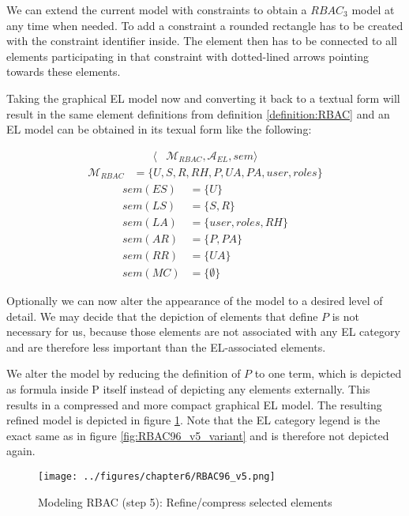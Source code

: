 \documentclass[twoside, openright, 12pt]{book}
\begin{document}
\noindent
We can extend the current model with constraints to obtain a $RBAC_3$ model at any time when needed.
To add a constraint a rounded rectangle has to be created with the constraint identifier inside.
The element then has to be connected to all elements participating in that constraint with dotted-lined arrows pointing towards these elements.

Taking the graphical EL model now and converting it back to a textual form will result in the same element definitions from definition \ref{definition:RBAC} and an EL model can be obtained in its texual form like the following:

\begin{align*}
\langle &\mathcal{M}_{RBAC}, \mathcal{A}_{EL}, sem \rangle
\end{align*}
\begin{align*}
\mathcal{M}_{RBAC} &= \lbrace U, S, R, RH, P, UA, PA, user, roles \rbrace
\end{align*}
\begin{align*}
sem(ES) &= \lbrace U \rbrace\\
sem(LS) &= \lbrace S, R \rbrace\\
sem(LA) &= \lbrace user, roles, RH \rbrace\\
sem(AR) &= \lbrace P, PA \rbrace\\
sem(RR) &= \lbrace UA \rbrace\\
sem(MC) &= \lbrace \emptyset \rbrace
\end{align*}

\noindent
Optionally we can now alter the appearance of the model to a desired level of detail.
We may decide that the depiction of elements that define $P$ is not necessary for us, because those elements are not associated with any EL category and are therefore less important than the EL-associated elements.

We alter the model by reducing the definition of $P$ to one term, which is depicted as formula inside P itself instead of depicting any elements externally.
This results in a compressed and more compact graphical EL model.
The resulting refined model is depicted in figure \ref{fig:RBAC96_v5}.
Note that the EL category legend is the exact same as in figure \ref{fig:RBAC96_v5_variant} and is therefore not depicted again.

\begin{figure}[htb]
	\centering
	\texttt{[image: ../figures/chapter6/RBAC96\_v5.png]}
	\caption{Modeling RBAC (step 5): Refine/compress selected elements}
	\label{fig:RBAC96_v5}
\end{figure}
\end{document}
